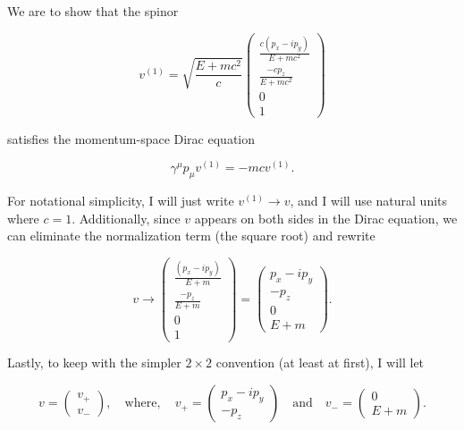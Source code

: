 \section{}

We are to show that the spinor

\begin{equation}
    v^{(1)} = \sqrt{\frac{E+mc^2}{c}} \begin{pmatrix}\frac{c(p_x - ip_y)}{E+mc^2} \\[4pt] \frac{-cp_z}{E+mc^2} \\[4pt] 0 \\ 1\end{pmatrix}
\end{equation}

satisfies the momentum-space Dirac equation 

\begin{equation}
    \gamma^{\mu}p_{\mu}v^{(1)} = -mc v^{(1)}.
\end{equation}

For notational simplicity, I will just write $v^{(1)} \rightarrow v$, and I will use natural units where $c=1$. Additionally, since $v$ appears on both sides in the Dirac equation, we can eliminate the normalization term (the square root) and rewrite

\begin{equation*}
    v \rightarrow \begin{pmatrix}\frac{(p_x - ip_y)}{E+m} \\[4pt] \frac{-p_z}{E+m} \\[4pt] 0 \\ 1\end{pmatrix} = \begin{pmatrix} p_x - ip_y \\ -p_z \\ 0 \\ E+m \end{pmatrix}.
\end{equation*}

Lastly, to keep with the simpler $2\times2$ convention (at least at first), I will let

\newcommand{\veeminus}{\begin{pmatrix}0 \\ E+m\end{pmatrix}}
\newcommand{\veeplus}{\begin{pmatrix}p_x - ip_y \\ -p_z\end{pmatrix}}
\begin{equation*}
    v = \begin{pmatrix}v_+ \\ v_-\end{pmatrix}, \quad \mathrm{where}, \quad v_+ = \veeplus \quad \mathrm{and} \quad v_- = \veeminus.
\end{equation*}

